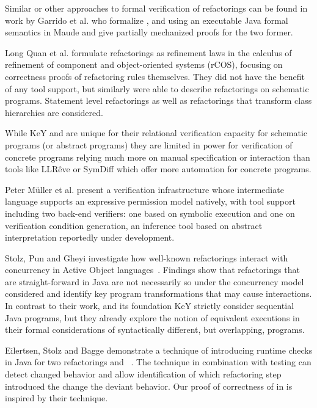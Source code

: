 Similar or other approaches to formal verification of refactorings can be found in work by
Garrido et al. \cite{garrido2006formal} who formalize ,
 and  using an executable
Java formal semantics in Maude and give partially mechanized proofs for the two former.

Long Quan et al. \cite{DBLP:conf/isola/QuanQL08} formulate refactorings as refinement
laws in the calculus of refinement of component and object-oriented systems (rCOS),
focusing on correctness proofs of refactoring rules themselves.
They did not have the benefit of any tool support, but similarly were able to describe
refactorings on schematic programs.
Statement level refactorings as well as refactorings that transform class hierarchies are considered.

While KeY and \Refinity{} are unique for their relational verification capacity for
schematic programs (or abstract programs) they are limited in power for verification
of concrete programs relying much more on manual specification or interaction \cite{DBLP:conf/aplas/Steinhofel20}
than tools like LLRêve \cite{DBLP:journals/jar/KieferKU18} or SymDiff \cite{DBLP:conf/cav/LahiriHKR12}
which offer more automation for concrete programs.

Peter M{\"u}ller et al. \cite{DBLP:series/natosec/0001SS17} present a verification infrastructure whose intermediate language supports
an expressive permission model natively, with tool support including two back-end verifiers: one based on
symbolic execution and one on verification condition generation, an inference tool based on abstract
interpretation reportedly under development.

Stolz, Pun and Gheyi investigate how well-known refactorings interact with concurrency in Active Object languages~\cite{DBLP:conf/isola/StolzPG20}.
Findings show that refactorings that are straight-forward in Java are not necessarily so under the concurrency model considered and identify key
program transformations that may cause interactions.
In contrast to their work, \Refinity{} and its foundation KeY strictly consider sequential Java programs,
but they already explore the notion of equivalent executions in their formal considerations of syntactically different, but overlapping, programs.

Eilertsen, Stolz and Bagge demonstrate a technique of introducing runtime checks in Java for two refactorings  and
~\cite{stolz:isolarefa}. The technique in combination with testing can detect changed behavior and allow identification
of which refactoring step introduced the change the deviant behavior.
Our proof of correctness of  in \Refinity{} is inspired by their technique.


